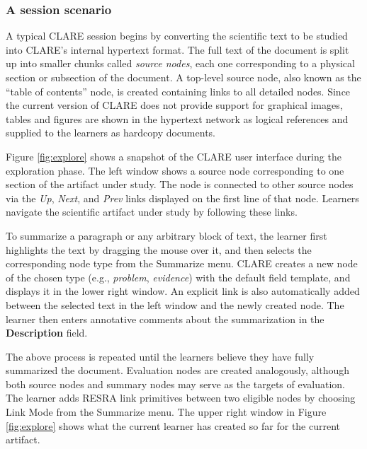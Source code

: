 \subsubsection{A session scenario}

A typical CLARE session begins by converting the scientific text to be
studied into CLARE's internal hypertext format. The full text of the
document is split up into smaller chunks called {\it source nodes\/}, each
one corresponding to a physical section or subsection of the document. A
top-level source node, also known as the ``table of contents'' node, is
created containing links to all detailed nodes. Since the current
version of CLARE does not provide support for graphical images, tables and
figures are shown in the hypertext network as logical references and
supplied to the learners as hardcopy documents.

Figure \ref{fig:explore} shows a snapshot of the CLARE user interface
during the exploration phase. The left window shows a source node
corresponding to one section of the artifact under study.  The node is
connected to other source nodes via the {\it Up\/}, {\it Next\/}, and {\it
Prev\/} links displayed on the first line of that node.  Learners navigate
the scientific artifact under study by following these links.

\begin{quotation}
\end{quotation}

To summarize a paragraph or any arbitrary block of text, the learner first
highlights the text by dragging the mouse over it, and then selects the
corresponding node type from the {\sf Summarize\/} menu. CLARE creates a
new node of the chosen type (e.g., {\em problem}, {\em evidence}) with the
default field template, and displays it in the lower right window. An
explicit link is also automatically added between the selected text in the
left window and the newly created node. The learner then enters annotative
comments about the summarization in the {\bf Description} field.

The above process is repeated until the learners believe they have fully
summarized the document.  Evaluation nodes are created analogously,
although both source nodes and summary nodes may serve as the targets of
evaluation.  The learner adds RESRA link primitives between two eligible
nodes by choosing {\sf Link Mode\/} from the {\sf Summarize\/} menu. The
upper right window in Figure \ref{fig:explore} shows what the current
learner has created so far for the current artifact.

